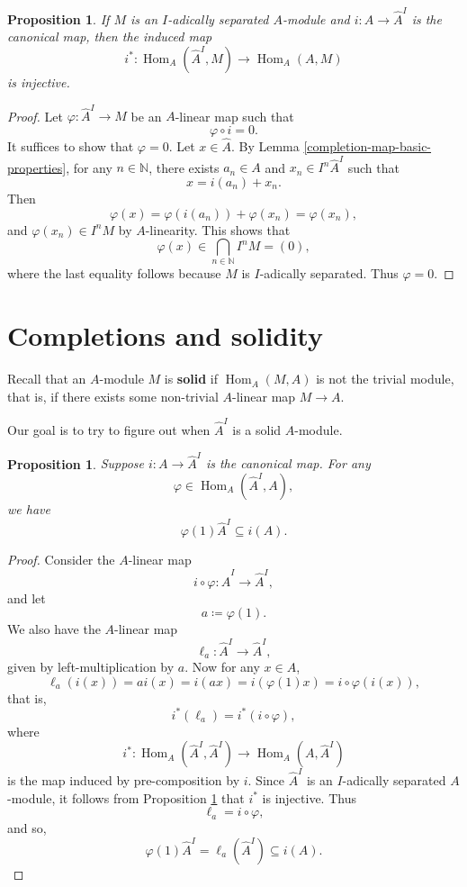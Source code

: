 \documentclass[11pt]{amsart}
\DeclareMathOperator{\Hom}{Hom}
\theoremstyle{plain}
\newtheorem{proposition}[subsubsection]{Proposition}
\theoremstyle{definition}
\theoremstyle{definition}
\theoremstyle{plain}
\theoremstyle{plain}
\numberwithin{equation}{subsubsection}
\numberwithin{equation}{subsubsection}
\begin{document}
\begin{proposition}
\label{maps-to-I-adic-separated}
If $M$ is an $I$-adically separated $A$-module and $i: A \rightarrow \widehat{A}^I$ is the canonical map, then the induced map 
$$i^*: \Hom_A(\widehat{A}^I, M) \rightarrow \Hom_A(A, M)$$
is injective. 
\end{proposition}

\begin{proof}
Let $\varphi: \widehat{A}^I \rightarrow M$ be an $A$-linear map such that 
$$\varphi \circ i = 0.$$
It suffices to show that $\varphi = 0$. Let $x \in \widehat{A}$. By Lemma \ref{completion-map-basic-properties}, for any $n \in \mathbb{N}$, there exists $a_n \in A$ and $x_n \in I^n\widehat{A}^I$ such that
$$x = i(a_n) + x_n.$$
Then
$$\varphi(x) = \varphi(i(a_n)) + \varphi(x_n) = \varphi(x_n),$$
and $\varphi(x_n) \in I^nM$ by $A$-linearity. This shows that
$$\varphi(x) \in \bigcap_{n \in \mathbb N} I^nM = (0),$$
where the last equality follows because $M$ is $I$-adically separated. Thus $\varphi = 0$.
\end{proof}








\section{Completions and solidity}

Recall that an $A$-module $M$ is \textbf{solid} if $\Hom_A(M, A)$ is not the trivial module, that is, if there exists some non-trivial $A$-linear map $M \rightarrow A$. 

Our goal is to try to figure out when $\widehat{A}^I$ is a solid $A$-module.

\begin{proposition}
\label{blah}
Suppose $i: A \rightarrow \widehat{A}^I$ is the canonical map. For any 
$$\varphi \in \Hom_A(\widehat{A}^I, A),$$
we have
$$\varphi(1)\widehat{A}^I \subseteq i(A).$$
\end{proposition}

\begin{proof}
Consider the $A$-linear map 
$$i \circ \varphi: \widehat{A}^I \rightarrow \widehat{A}^I,$$
and let 
$$a \coloneqq \varphi(1).$$
We also have the $A$-linear map
$$\ell_a: \widehat{A}^I \rightarrow \widehat{A}^I,$$
given by left-multiplication by $a$. Now for any $x \in A$, 
$$\ell_a(i(x)) = ai(x) = i(ax) = i(\varphi(1)x) = i \circ \varphi (i(x)),$$
that is,
$$i^*(\ell_a) = i^*(i \circ \varphi),$$
where 
$$i^*: \Hom_A(\widehat{A}^I, \widehat{A}^I) \rightarrow \Hom_A(A, \widehat{A}^I)$$
is the map induced by pre-composition by $i$. Since $\widehat{A}^I$ is an $I$-adically separated $A$-module, it follows from Proposition \ref{maps-to-I-adic-separated} that $i^*$ is injective. Thus
$$\ell_a = i \circ \varphi,$$
and so,
$$\varphi(1)\widehat{A}^I = \ell_a(\widehat{A}^I) \subseteq i(A).$$
\end{proof}
\end{document}
